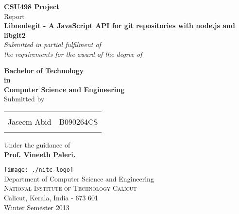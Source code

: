 \begin{titlepage}

\begin{center}

\textup{\small {\bf CSU498 Project} \\ Report}\\[0.2in]

\Large \textbf {Libnodegit - A JavaScript API for git repositories with
node.js and libgit2}\\[0.5in]

       \small \emph{Submitted in partial fulfilment of\\
        the requirements for the award of the degree of}
        \vspace{.2in}

       {\bf Bachelor of Technology \\in\\ Computer Science and Engineering}\\[0.5in]

\normalsize Submitted by \\
\begin{table}[h]
  \centering
  \begin{tabular}{lr}\hline \\
    Jaseem Abid & B090264CS \\ \\ \hline
  \end{tabular}
\end{table}

\vspace{.1in}
Under the guidance of\\
{\textbf{Prof. Vineeth Paleri.}}\\[0.2in]

\vfill

\texttt{[image: ./nitc-logo]}\\[0.1in]
\Large{Department of Computer Science and Engineering}\\
\normalsize
\textsc{National Institute of Technology Calicut}\\
Calicut, Kerala, India - 673 601 \\
\vspace{0.2cm}
Winter Semester 2013

\end{center}

\end{titlepage}
